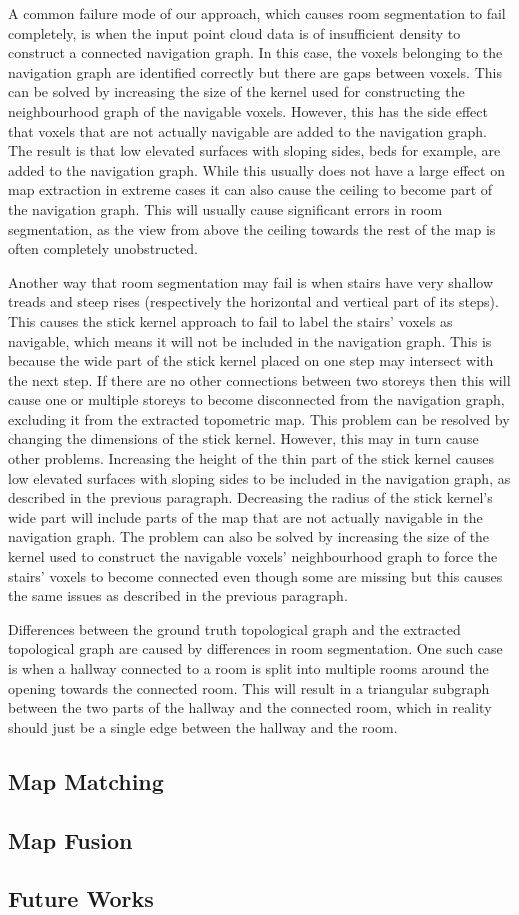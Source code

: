 A common failure mode of our approach, which causes room segmentation to fail completely, is when the input point cloud data is of insufficient density to construct a connected navigation graph. In this case, the voxels belonging to the navigation graph are identified correctly but there are gaps between voxels. This can be solved by increasing the size of the kernel used for constructing the neighbourhood graph of the navigable voxels. However, this has the side effect that voxels that are not actually navigable are added to the navigation graph. The result is that low elevated surfaces with sloping sides, beds for example, are added to the navigation graph. While this usually does not have a large effect on map extraction in extreme cases it can also cause the ceiling to become part of the navigation graph. This will usually cause significant errors in room segmentation, as the view from above the ceiling towards the rest of the map is often completely unobstructed.

Another way that room segmentation may fail is when stairs have very shallow treads and steep rises (respectively the horizontal and vertical part of its steps). This causes the stick kernel approach to fail to label the stairs' voxels as navigable, which means it will not be included in the navigation graph. This is because the wide part of the stick kernel placed on one step may intersect with the next step. If there are no other connections between two storeys then this will cause one or multiple storeys to become disconnected from the navigation graph, excluding it from the extracted topometric map. This problem can be resolved by changing the dimensions of the stick kernel. However, this may in turn cause other problems. Increasing the height of the thin part of the stick kernel causes low elevated surfaces with sloping sides to be included in the navigation graph, as described in the previous paragraph. Decreasing the radius of the stick kernel's wide part will include parts of the map that are not actually navigable in the navigation graph. The problem can also be solved by increasing the size of the kernel used to construct the navigable voxels' neighbourhood graph to force the stairs'  voxels to become connected even though some are missing but this causes the same issues as described in the previous paragraph.

Differences between the ground truth topological graph and the extracted topological graph are caused by differences in room segmentation. One such case is when a hallway connected to a room is split into multiple rooms around the opening towards the connected room. This will result in a triangular subgraph between the two parts of the hallway and the connected room, which in reality should just be a single edge between the hallway and the room. 

\subsection{Map Matching}
\subsection{Map Fusion}
\subsection{Future Works}
